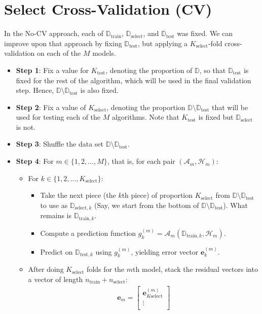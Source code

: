 \documentclass[12pt, a4paper]{article}
\theoremstyle{definition}
\newcommand{\test}{\text{test}}
\newcommand{\train}{\text{train}}
\newcommand{\select}{\text{select}}
\newcommand{\Dtest}{\mathbb{D}_{\test}}
\newcommand{\Dtrain}{\mathbb{D}_{\train}}
\newcommand{\Dselect}{\mathbb{D}_{\select}}
\begin{document}
	\section*{Select Cross-Validation (CV)}
	In the No-CV approach, each of $\Dtrain$, $\Dselect$, and $\Dtest$ was fixed.
	We can improve upon that approach by fixing $\Dtest$, but applying a $K_\select$-fold
	cross-validation on each of the $M$ models.
	\begin{itemize}
		\item \textbf{Step 1}: Fix a value for $K_\test$, denoting the proportion
		of $\mathbb{D}$, so that $\Dtest$ is fixed for the rest of the algorithm,
		which will be used in the final validation step. Hence, $\mathbb{D}\setminus \Dtest$
		is also fixed.
		\item \textbf{Step 2}: Fix a value of $K_\select$, denoting the proportion $\mathbb{D}\setminus \Dtest$
		that will be used for testing each of the $M$ algorithms. Note that $K_\test$
		is fixed but $\Dselect$ is not.
		\item \textbf{Step 3}: Shuffle the data set $\mathbb{D}\setminus \Dtest$.
		\item \textbf{Step 4}: For $m\in \{1,2,\ldots,M\}$, that is, for each pair
		$(\mathcal{A}_m,\mathcal{H}_m)$:
		\begin{itemize}
			\item For $k\in \{1,2,\ldots,K_\select\}$:
			\begin{itemize}
				\item Take the next piece (the $k$th piece) of proportion $K_\select$
				from $\mathbb{D}\setminus \Dtest$ to use as $\mathbb{D}_{\text{select}, k}$
				(Say, we start from the bottom of $\mathbb{D}\setminus \Dtest$).
				What remains is $\mathbb{D}_{\text{train}, k}$.
				\item Compute a prediction function $g_{k}^{(m)}=\mathcal{A}_m(\mathbb{D}_{\train, k}, \mathcal{H}_m)$.
				\item Predict on $\mathbb{D}_{\test, k}$ using $g_{k}^{(m)}$, yielding error
				vector $\bm{e}_k^{(m)}$.
			\end{itemize}
			\item After doing $K_\select$ folds for the $m$th model, stack the residual
			vectors into a vector of length $n_\train + n_\select$:
			\begin{align*}
				\bm{e}_m = 
					\begin{bmatrix}
						\bm{e}_{K\select}^{(m)}\\
						\vdots\\

\end{bmatrix}
\end{align*}
\end{itemize}
\end{itemize}
\end{document}
